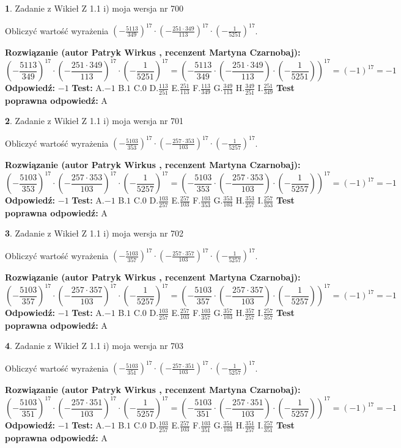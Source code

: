 \documentclass[12pt, a4paper]{article}
\theoremstyle{definition} %
\newtheorem{zad}{}
\newcommand{\zadStart}[1]{\begin{zad}#1\newline}
\newcommand{\zadStop}{\end{zad}}
\newcommand{\rozwStart}[2]{\noindent \textbf{Rozwiązanie (autor #1 , recenzent #2): }\newline}
\newcommand{\rozwStop}{\newline}
\newcommand{\odpStart}{\noindent \textbf{Odpowiedź:}\newline}
\newcommand{\odpStop}{\newline}
\newcommand{\testStart}{\noindent \textbf{Test:}\newline}
\newcommand{\testStop}{\newline}
\newcommand{\kluczStart}{\noindent \textbf{Test poprawna odpowiedź:}\newline}
\newcommand{\kluczStop}{\newline}
\begin{document}
\zadStart{Zadanie z Wikieł Z 1.1 i) moja wersja nr 700}

Obliczyć wartość wyrażenia $(-\frac{5113}{349})^{17} \cdot (-\frac{251 \cdot 349}{113})^{17} \cdot (-\frac{1}{5251})^{17}$.
\zadStop
\rozwStart{Patryk Wirkus}{Martyna Czarnobaj}
$$(-\frac{5113}{349})^{17} \cdot (-\frac{251 \cdot 349}{113})^{17} \cdot (-\frac{1}{5251})^{17} = (-\frac{5113}{349} \cdot (-\frac{251 \cdot 349}{113}) \cdot (-\frac{1}{5251}))^{17} = (-1)^{17} = -1$$
\rozwStop
\odpStart
$-1$
\odpStop
\testStart
A.$-1$ B.$1$ C.$0$ D.$\frac{113}{251}$ E.$\frac{251}{113}$
F.$\frac{113}{349}$ G.$\frac{349}{113}$
H.$\frac{349}{251}$
I.$\frac{251}{349}$
\testStop
\kluczStart
A
\kluczStop



\zadStart{Zadanie z Wikieł Z 1.1 i) moja wersja nr 701}

Obliczyć wartość wyrażenia $(-\frac{5103}{353})^{17} \cdot (-\frac{257 \cdot 353}{103})^{17} \cdot (-\frac{1}{5257})^{17}$.
\zadStop
\rozwStart{Patryk Wirkus}{Martyna Czarnobaj}
$$(-\frac{5103}{353})^{17} \cdot (-\frac{257 \cdot 353}{103})^{17} \cdot (-\frac{1}{5257})^{17} = (-\frac{5103}{353} \cdot (-\frac{257 \cdot 353}{103}) \cdot (-\frac{1}{5257}))^{17} = (-1)^{17} = -1$$
\rozwStop
\odpStart
$-1$
\odpStop
\testStart
A.$-1$ B.$1$ C.$0$ D.$\frac{103}{257}$ E.$\frac{257}{103}$
F.$\frac{103}{353}$ G.$\frac{353}{103}$
H.$\frac{353}{257}$
I.$\frac{257}{353}$
\testStop
\kluczStart
A
\kluczStop



\zadStart{Zadanie z Wikieł Z 1.1 i) moja wersja nr 702}

Obliczyć wartość wyrażenia $(-\frac{5103}{357})^{17} \cdot (-\frac{257 \cdot 357}{103})^{17} \cdot (-\frac{1}{5257})^{17}$.
\zadStop
\rozwStart{Patryk Wirkus}{Martyna Czarnobaj}
$$(-\frac{5103}{357})^{17} \cdot (-\frac{257 \cdot 357}{103})^{17} \cdot (-\frac{1}{5257})^{17} = (-\frac{5103}{357} \cdot (-\frac{257 \cdot 357}{103}) \cdot (-\frac{1}{5257}))^{17} = (-1)^{17} = -1$$
\rozwStop
\odpStart
$-1$
\odpStop
\testStart
A.$-1$ B.$1$ C.$0$ D.$\frac{103}{257}$ E.$\frac{257}{103}$
F.$\frac{103}{357}$ G.$\frac{357}{103}$
H.$\frac{357}{257}$
I.$\frac{257}{357}$
\testStop
\kluczStart
A
\kluczStop



\zadStart{Zadanie z Wikieł Z 1.1 i) moja wersja nr 703}

Obliczyć wartość wyrażenia $(-\frac{5103}{351})^{17} \cdot (-\frac{257 \cdot 351}{103})^{17} \cdot (-\frac{1}{5257})^{17}$.
\zadStop
\rozwStart{Patryk Wirkus}{Martyna Czarnobaj}
$$(-\frac{5103}{351})^{17} \cdot (-\frac{257 \cdot 351}{103})^{17} \cdot (-\frac{1}{5257})^{17} = (-\frac{5103}{351} \cdot (-\frac{257 \cdot 351}{103}) \cdot (-\frac{1}{5257}))^{17} = (-1)^{17} = -1$$
\rozwStop
\odpStart
$-1$
\odpStop
\testStart
A.$-1$ B.$1$ C.$0$ D.$\frac{103}{257}$ E.$\frac{257}{103}$
F.$\frac{103}{351}$ G.$\frac{351}{103}$
H.$\frac{351}{257}$
I.$\frac{257}{351}$
\testStop
\kluczStart
A
\kluczStop
\end{document}

